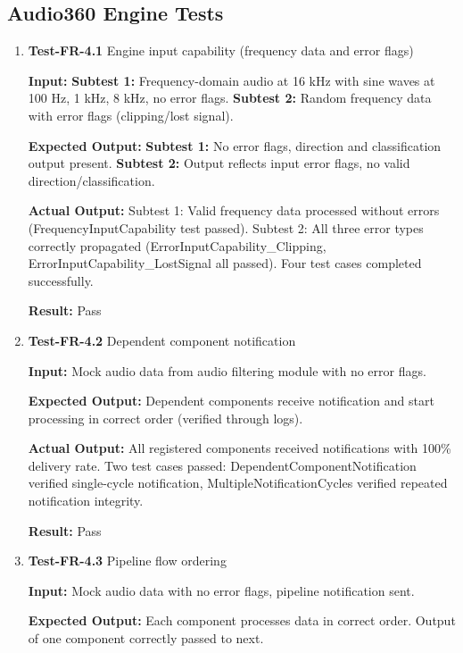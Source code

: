 \documentclass[12pt, titlepage]{article}
\begin{document}
\subsection{Audio360 Engine Tests}

\begin{enumerate}

\item{\textbf{Test-FR-4.1} Engine input capability (frequency data and error
flags) \\}

\textbf{Input:}
\textbf{Subtest 1:} Frequency-domain audio at 16 kHz with sine waves at 100 Hz,
 1 kHz, 8 kHz, no error flags. \textbf{Subtest 2:} Random frequency data with
 error flags (clipping/lost signal).

\textbf{Expected Output:}
\textbf{Subtest 1:} No error flags, direction and classification output present.
 \textbf{Subtest 2:} Output reflects input error flags, no valid
 direction/classification.

\textbf{Actual Output:}
Subtest 1: Valid frequency data processed without errors
(FrequencyInputCapability test passed). Subtest 2: All three error types
correctly propagated (ErrorInputCapability\_Clipping,
ErrorInputCapability\_LostSignal all passed).
Four test cases completed successfully.

\textbf{Result:} Pass

\item{\textbf{Test-FR-4.2} Dependent component notification \\}

\textbf{Input:}
Mock audio data from audio filtering module with no error flags.

\textbf{Expected Output:}
Dependent components receive notification and start processing in correct order
(verified through logs).

\textbf{Actual Output:}
All registered components received notifications with 100\% delivery rate. Two
test cases passed: DependentComponentNotification verified single-cycle
notification, MultipleNotificationCycles verified repeated notification
integrity.

\textbf{Result:} Pass

\item{\textbf{Test-FR-4.3} Pipeline flow ordering \\}

\textbf{Input:}
Mock audio data with no error flags, pipeline notification sent.

\textbf{Expected Output:}
Each component processes data in correct order. Output of one component
correctly passed to next.


\end{enumerate}
\end{document}
